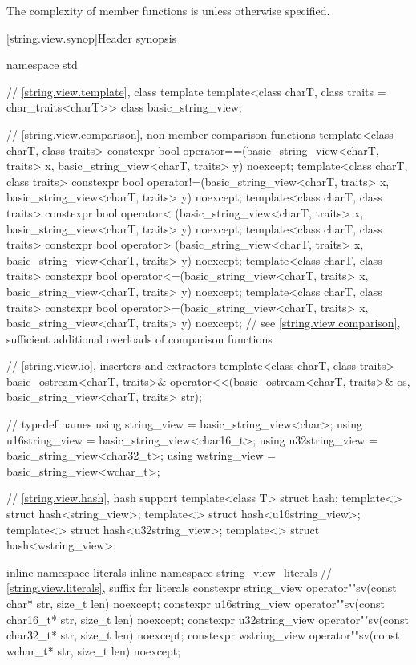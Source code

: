 \pnum
The complexity of  member functions is  unless otherwise specified.

[string.view.synop]{Header  synopsis}

%
\begin{codeblock}
namespace std {
  // \ref{string.view.template}, class template 
  template<class charT, class traits = char_traits<charT>>
  class basic_string_view;

  // \ref{string.view.comparison}, non-member comparison functions
  template<class charT, class traits>
    constexpr bool operator==(basic_string_view<charT, traits> x,
                              basic_string_view<charT, traits> y) noexcept;
  template<class charT, class traits>
    constexpr bool operator!=(basic_string_view<charT, traits> x,
                              basic_string_view<charT, traits> y) noexcept;
  template<class charT, class traits>
    constexpr bool operator< (basic_string_view<charT, traits> x,
                              basic_string_view<charT, traits> y) noexcept;
  template<class charT, class traits>
    constexpr bool operator> (basic_string_view<charT, traits> x,
                              basic_string_view<charT, traits> y) noexcept;
  template<class charT, class traits>
    constexpr bool operator<=(basic_string_view<charT, traits> x,
                              basic_string_view<charT, traits> y) noexcept;
  template<class charT, class traits>
    constexpr bool operator>=(basic_string_view<charT, traits> x,
                              basic_string_view<charT, traits> y) noexcept;
  // see \ref{string.view.comparison}, sufficient additional overloads of comparison functions

  // \ref{string.view.io}, inserters and extractors
  template<class charT, class traits>
    basic_ostream<charT, traits>&
      operator<<(basic_ostream<charT, traits>& os,
                 basic_string_view<charT, traits> str);

  //  typedef names
  using string_view    = basic_string_view<char>;
  using u16string_view = basic_string_view<char16_t>;
  using u32string_view = basic_string_view<char32_t>;
  using wstring_view   = basic_string_view<wchar_t>;

  // \ref{string.view.hash}, hash support
  template<class T> struct hash;
  template<> struct hash<string_view>;
  template<> struct hash<u16string_view>;
  template<> struct hash<u32string_view>;
  template<> struct hash<wstring_view>;

  inline namespace literals {
  inline namespace string_view_literals {
    // \ref{string.view.literals}, suffix for  literals
    constexpr string_view    operator""sv(const char* str, size_t len) noexcept;
    constexpr u16string_view operator""sv(const char16_t* str, size_t len) noexcept;
    constexpr u32string_view operator""sv(const char32_t* str, size_t len) noexcept;
    constexpr wstring_view   operator""sv(const wchar_t* str, size_t len) noexcept;
  }
  }
}
\end{codeblock}


